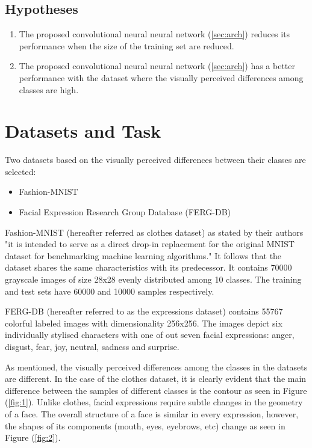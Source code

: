 \documentclass{article}
\begin{document}
\subsection{Hypotheses}
\label{sec:hypotheses}
\begin{enumerate}[label=\textbf{H.\arabic*}]
  \item \label{h:1} The proposed convolutional neural neural network (\ref{sec:arch}) reduces its performance when the size of the training set are reduced. 
  \item \label{h:2} The proposed convolutional neural neural network (\ref{sec:arch}) has a better performance with the dataset where the visually perceived differences among classes are high.
 \end{enumerate}


\section{Datasets and Task}
\label{sec:data}

Two datasets based on the visually perceived differences between their classes are selected: 
\begin{itemize}
  \item Fashion-MNIST \citep{DBLP:journals/corr/abs-1708-07747}
  \item Facial Expression Research Group Database (FERG-DB)\citep{aneja2016modeling}
\end{itemize}

Fashion-MNIST (hereafter referred as clothes dataset) as stated by their authors "it is intended to serve as a direct drop-in replacement for the original MNIST dataset for benchmarking machine learning algorithms." It follows that the dataset shares the same characteristics with its predecessor. It contains 70000 grayscale images of size 28x28 evenly distributed among 10 classes. The training and test sets have 60000 and 10000 samples respectively.

FERG-DB (hereafter referred to as the expressions dataset) contains 55767 colorful labeled images with dimensionality 256x256. The images depict six individually stylised characters with one of out seven facial expressions: anger, disgust, fear, joy, neutral, sadness and surprise.

As mentioned, the visually perceived differences among the classes in the datasets are different. In the case of the clothes dataset, it is clearly evident that the main difference between the samples of different classes is the contour as seen in Figure (\ref{fig:1}). Unlike clothes, facial expressions require subtle changes in the geometry of a face. The overall structure of a face is similar in every expression, however, the shapes of its components (mouth, eyes, eyebrows, etc) change as seen in Figure (\ref{fig:2}).
\end{document}
